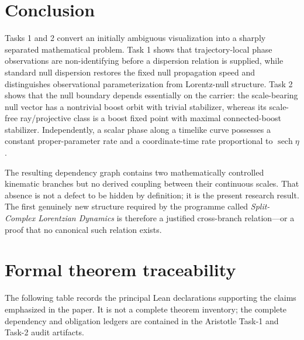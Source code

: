 \documentclass[11pt,a4paper]{article}
\newcommand{\sech}{\operatorname{sech}}
\begin{document}
\section{Conclusion}

Tasks 1 and 2 convert an initially ambiguous visualization into a sharply separated mathematical problem.  Task 1 shows that trajectory-local phase observations are non-identifying before a dispersion relation is supplied, while standard null dispersion restores the fixed null propagation speed and distinguishes observational parameterization from Lorentz-null structure.  Task 2 shows that the null boundary depends essentially on the carrier: the scale-bearing null vector has a nontrivial boost orbit with trivial stabilizer, whereas its scale-free ray/projective class is a boost fixed point with maximal connected-boost stabilizer.  Independently, a scalar phase along a timelike curve possesses a constant proper-parameter rate and a coordinate-time rate proportional to $\sech\eta$.

The resulting dependency graph contains two mathematically controlled kinematic branches but no derived coupling between their continuous scales.  That absence is not a defect to be hidden by definition; it is the present research result.  The first genuinely new structure required by the programme called \emph{Split-Complex Lorentzian Dynamics} is therefore a justified cross-branch relation---or a proof that no canonical such relation exists.

\appendix
\section{Formal theorem traceability}
\label{app:trace}

The following table records the principal Lean declarations supporting the claims emphasized in the paper.  It is not a complete theorem inventory; the complete dependency and obligation ledgers are contained in the Aristotle Task-1 and Task-2 audit artifacts.
\end{document}
